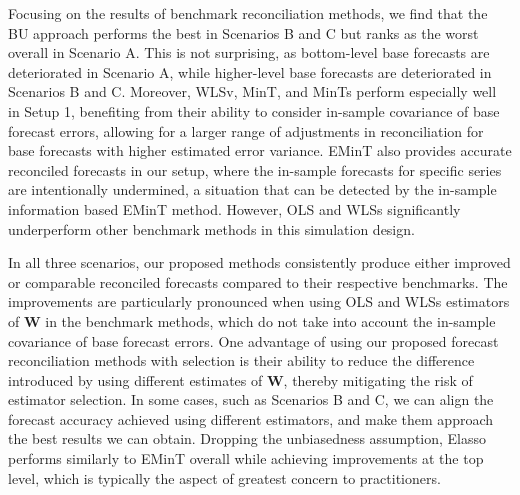 \documentclass[
  11pt]{article}
\begin{document}
Focusing on the results of benchmark reconciliation methods, we find
that the BU approach performs the best in Scenarios B and C but ranks as
the worst overall in Scenario A. This is not surprising, as bottom-level
base forecasts are deteriorated in Scenario A, while higher-level base
forecasts are deteriorated in Scenarios B and C. Moreover, WLSv, MinT,
and MinTs perform especially well in Setup 1, benefiting from their
ability to consider in-sample covariance of base forecast errors,
allowing for a larger range of adjustments in reconciliation for base
forecasts with higher estimated error variance. EMinT also provides
accurate reconciled forecasts in our setup, where the in-sample
forecasts for specific series are intentionally undermined, a situation
that can be detected by the in-sample information based EMinT method.
However, OLS and WLSs significantly underperform other benchmark methods
in this simulation design.

In all three scenarios, our proposed methods consistently produce either
improved or comparable reconciled forecasts compared to their respective
benchmarks. The improvements are particularly pronounced when using OLS
and WLSs estimators of \(\bm{W}\) in the benchmark methods, which do not
take into account the in-sample covariance of base forecast errors. One
advantage of using our proposed forecast reconciliation methods with
selection is their ability to reduce the difference introduced by using
different estimates of \(\bm{W}\), thereby mitigating the risk of
estimator selection. In some cases, such as Scenarios B and C, we can
align the forecast accuracy achieved using different estimators, and
make them approach the best results we can obtain. Dropping the
unbiasedness assumption, Elasso performs similarly to EMinT overall
while achieving improvements at the top level, which is typically the
aspect of greatest concern to practitioners.
\end{document}
